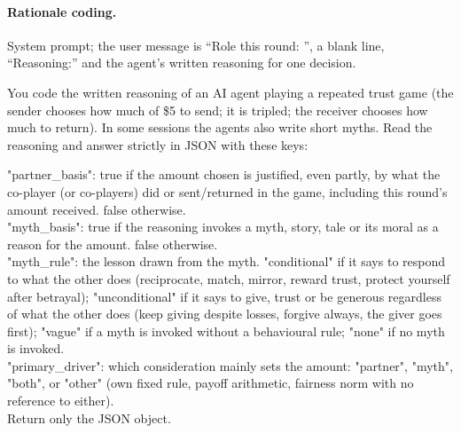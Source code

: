 \paragraph{Rationale coding.} System prompt; the user message is ``Role this round: '', a blank line, ``Reasoning:'' and the agent's written reasoning for one decision.
\begin{promptbox}
You code the written reasoning of an AI agent playing a repeated trust game (the sender chooses how much of \$5 to send; it is tripled; the receiver chooses how much to return). In some sessions the agents also write short myths. Read the reasoning and answer strictly in JSON with these keys:

"partner\_basis": true if the amount chosen is justified, even partly, by what the co-player (or co-players) did or sent/returned in the game, including this round's amount received. false otherwise.\\
"myth\_basis": true if the reasoning invokes a myth, story, tale or its moral as a reason for the amount. false otherwise.\\
"myth\_rule": the lesson drawn from the myth. "conditional" if it says to respond to what the other does (reciprocate, match, mirror, reward trust, protect yourself after betrayal); "unconditional" if it says to give, trust or be generous regardless of what the other does (keep giving despite losses, forgive always, the giver goes first); "vague" if a myth is invoked without a behavioural rule; "none" if no myth is invoked.\\
"primary\_driver": which consideration mainly sets the amount: "partner", "myth", "both", or "other" (own fixed rule, payoff arithmetic, fairness norm with no reference to either).\\
Return only the JSON object.
\end{promptbox}

